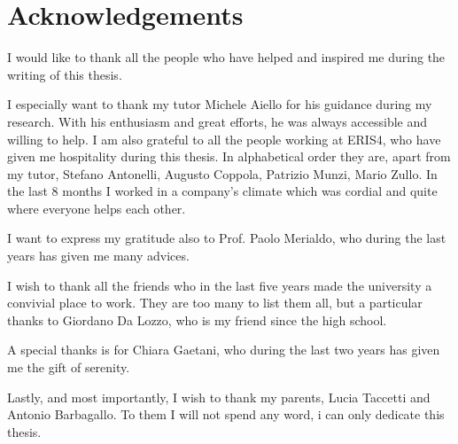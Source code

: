 \chapter{Acknowledgements}
I would like to thank all the people who have helped and inspired me during the writing of this thesis.

I especially want to thank my tutor Michele Aiello for his guidance during my research. With his enthusiasm and great efforts, he was always accessible and willing to help. I am also grateful to all the people working at ERIS4, who have given me hospitality during this thesis. In alphabetical order they are, apart from my tutor, Stefano Antonelli, Augusto Coppola, Patrizio Munzi, Mario Zullo. In the last 8 months I worked in a company's climate which was cordial and quite where everyone helps each other.

I want to express my gratitude also to Prof. Paolo Merialdo, who during the last years has given me many advices.

I wish to thank all the friends who in the last five years made the university a convivial place to work. They are too many to list them all, but a particular thanks to Giordano Da Lozzo, who is my friend since the high school.

A special thanks is for Chiara Gaetani, who during the last two years has given me the gift of serenity.

Lastly, and most importantly, I wish to thank my parents, Lucia Taccetti and Antonio Barbagallo. To them I will not spend any word, i can only dedicate this thesis.

